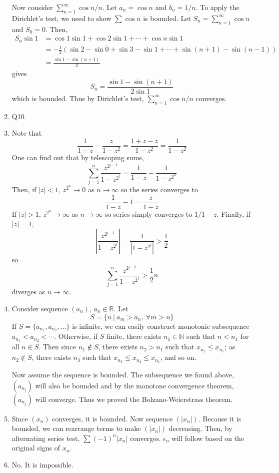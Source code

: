 \documentclass[10pt, a4paper, twoside]{report}
\begin{document}
\begin{enumerate}[{1.}]
    Now consider \(\sum_{n=1}^\infty\cos n/n\). Let \(a_n=\cos n\) and \(b_n=1/n\). To apply the Dirichlet's test, we need to show \(\sum\cos n\) is bounded. Let \(S_n=\sum_{n=1}^{\infty}\cos n\) and \(S_0=0\). Then,
    \begin{align*}
        S_n\sin 1&=\cos 1\sin 1+\cos 2\sin 1+\cdots+\cos n\sin 1 \\
        &=-\frac 12(\sin 2-\sin 0+\sin 3-\sin 1+\cdots+\sin(n+1)-\sin (n-1)) \\
        &=\frac{\sin 1-\sin(n+1)}{2}
    \end{align*}
    gives 
    \[S_n=\frac{\sin 1-\sin(n+1)}{2\sin 1}\]
    which is bounded. Thus by Dirichlet's test,  \(\sum_{n=1}^\infty\cos n/n\) converges.
    \item Q10.
    \item Note that 
    \[\frac{1}{1-z}-\frac{z}{1-z^2}=\frac{1+z-z}{1-z^2}=\frac{1}{1-z^2}\]
    One can find out that by telescoping sums, 
    \[\sum_{j=1}^n\frac{z^{2^{j-1}}}{1-z^{2^j}}=\frac{1}{1-z}-\frac{1}{1-z^{2^n}}\]
    Then, if \(|z|<1\), \(z^{2^n}\to 0\) as \(n\to\infty\) so the series converges to 
    \[\frac 1{1-z}-1=\frac{z}{1-z}\]
    If \(|z|>1\), \(z^{2^n}\to\infty\) as \(n\to\infty\) so series simply converges to \(1/1-z\). Finally, if \(|z|=1\), 
    \[\left|\frac{z^{2^{j-1}}}{1-z^{2^j}}\right|=\frac 1{|1-z^{2^j}|}>\frac 12\]
    so 
    \[\sum_{j=1}^n\frac{z^{2^{j-1}}}{1-z^{2^j}}>\frac 12n\]
    diverges as \(n\to\infty\).
    \item Consider sequence \((a_n)\), \(a_n\in\mathbb{R}\). Let 
    \[S=\{n\:|\:a_m>a_n,\:\forall m>n\}\]
    If \(S=\{a_{n_1},a_{n_2},\ldots\}\) is infinite, we can easily construct monotonic subsequence \(a_{n_1}<a_{n_2}<\cdots\). Otherwise, if \(S\) finite, there exists \(n_1\in\mathbb{N}\) such that \(n<n_1\) for all \(n\in S\). Then since \(n_1\notin S\), there exists \(n_2>n_1\) such that \(x_{n_2}\leq x_{n_1}\); as \(n_2\notin S\), there exists \(n_3\) such that \(x_{n_3}\leq x_{n_2}\leq x_{n_1}\), and so on. 
    
    Now assume the sequence is bounded. The subsequence we found above, \((a_{n_j})\) will also be bounded and by the monotone convergence theorem, \((a_{n_j})\) will converge. Thus we proved the Bolzano-Weierstrass theorem.
    \item Since \((x_n)\) converges, it is bounded. Now sequence \((|x_n|)\). Because it is bounded, we can rearrange terms to make \((|x_n|)\) decreasing. Then, by alternating series test, \(\sum (-1)^n|x_n|\) converges. \(\epsilon_n\) will follow based on the original signs of \(x_n\).
    \item No. It is impossible.
\end{enumerate}
\end{document}
